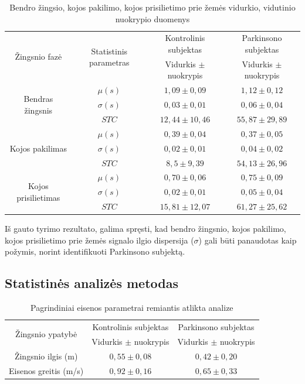 \documentclass[]{vgtuef}
\begin{document}
\begin{table}
  \centering
  \renewcommand{\arraystretch}{1.3}
  \caption{Bendro žingsio, kojos pakilimo, kojos prisilietimo prie žemės vidurkio, vidutinio nuokrypio duomenys \cite{5280353}}
  \label{table:gait_corr_params}
	\begin{tabular}{|c|c|c|c|} \hline
		 \multirow{2}{*}{Žingsnio fazė} & 
		 \multirow{2}{*}{Statistinis parametras} & Kontrolinis subjektas & Parkinsono subjektas \\ 	\cline{3-4}
		 & & Vidurkis $\pm$ nuokrypis & Vidurkis $\pm$ nuokrypis \\ \hline
		 \multirow{3}{*}{Bendras žingsnis} 
		 	& $\mu(s)$    & $1,09 \pm 0,09$   & $1,12 \pm 0,12$ \\ \cline{2-4}
		 	& $\sigma(s)$ & $0,03 \pm 0,01$   & $0,06 \pm 0,04$ \\ \cline{2-4} 
		 	& $STC$       & $12,44 \pm 10,46$ & $55,87 \pm 29,89$ \\ \hline
		 \multirow{3}{*}{Kojos pakilimas}
	 	 	& $\mu(s)$    & $0,39 \pm 0,04$   & $0,37 \pm 0,05$ \\ \cline{2-4}
		 	& $\sigma(s)$ & $0,02 \pm 0,01$   & $0,04 \pm 0,02$ \\ \cline{2-4} 
		 	& $STC$       & $8,5 \pm 9,39$    & $54,13 \pm 26,96$ \\ \hline
		 \multirow{3}{*}{Kojos prisilietimas}
		 	& $\mu(s)$    & $0,70 \pm 0,06$   & $0,75 \pm 0,09$ \\ \cline{2-4}
		 	& $\sigma(s)$ & $0,02 \pm 0,01$   & $0,05 \pm 0,04$ \\ \cline{2-4} 
		 	& $STC$       & $15,81 \pm 12,07$ & $61,27 \pm 25,62$ \\ \hline
	\end{tabular}
\end{table}

Iš gauto tyrimo rezultato, galima spręsti, kad bendro žingsnio, kojos pakilimo, kojos prisilietimo prie žemės signalo ilgio dispersija ($\sigma$) gali būti panaudotas kaip požymis, norint identifikuoti Parkinsono subjektą.

\subsection{Statistinės analizės metodas}


\begin{table}
	\centering
	\renewcommand{\arraystretch}{1.3}
	\caption{Pagrindiniai eisenos parametrai remiantis atlikta analize \cite{6151536}}
	\label{table:statistics_st_wa}
	\begin{tabular}{|c|c|c|} \hline
		\multirow{2}{*}{Žingsnio ypatybė} & Kontrolinis subjektas & Parkinsono subjektas \\ \cline{2-3}
			& Vidurkis $\pm$ nuokrypis & Vidurkis $\pm$ nuokrypis \\ \hline
		Žingsnio ilgis (m)    & $0,55\pm0,08$ & $0,42\pm0,20$ \\ \hline
		Eisenos greitis (m/s) & $0,92\pm0,16$ & $0,65\pm0,33$ \\ \hline
	\end{tabular}
\end{table}
\end{document}
